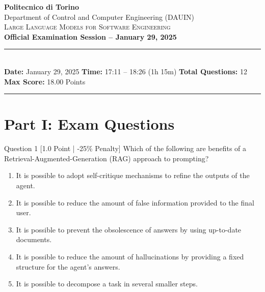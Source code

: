 \documentclass[11pt,a4paper]{article}
\begin{document}
\begin{center}
    {\LARGE\textbf{\color{primary}Politecnico di Torino}}\\[0.25cm]
    {\large Department of Control and Computer Engineering (DAUIN)}\\[0.15cm]
    {\large\textsc{Large Language Models for Software Engineering}}\\[0.4cm]
    {\Large\textbf{Official Examination Session -- January 29, 2025}}\\[0.3cm]
    \rule{\textwidth}{0.8pt}\\[0.2cm]
    \small\textbf{Date:} January 29, 2025 \quad\textbar\quad
    \textbf{Time:} 17:11 -- 18:26 (1h 15m) \quad\textbar\quad
    \textbf{Total Questions:} 12 \quad\textbar\quad
    \textbf{Max Score:} 18.00 Points
    \rule{\textwidth}{0.8pt}
\end{center}

\vspace{0.3cm}
\tableofcontents
\newpage

\section{Part I: Exam Questions}

\begin{questionbox}{Question 1 \hfill [1.0 Point | -25\% Penalty]}
Which of the following are benefits of a Retrieval-Augmented-Generation (RAG) approach to prompting?
\begin{enumerate}[label=(\alph*)]
    \item It is possible to adopt self-critique mechanisms to refine the outputs of the agent.
    \item It is possible to reduce the amount of false information provided to the final user.
    \item It is possible to prevent the obsolescence of answers by using up-to-date documents.
    \item It is possible to reduce the amount of hallucinations by providing a fixed structure for the agent's answers.
    \item It is possible to decompose a task in several smaller steps.
\end{enumerate}
\end{questionbox}
\end{document}
